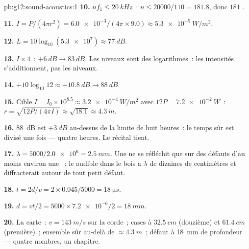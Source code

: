 \begin{solution}{pb:g12:sound-acoustics:1}
\textbf{10.} $nf_1 \le \qty{20}{kHz}$~: $n \le 20000/110 = 181.8$,
donc $181$ .

\textbf{11.} $I = P/(4\pi r^2) = \num{6.0e-3}/(4\pi \times 9.0)
\approx \qty{5.3e-5}{W/m^2}$.

\textbf{12.} $L = 10\log_{10}(\num{5.3e7}) \approx \qty{77}{dB}$.

\textbf{13.} $I \times 4$~: $+\qty{6}{dB} \to \qty{83}{dB}$. Les
niveaux sont des logarithmes~: les intensités s'additionnent, pas les
niveaux.

\textbf{14.} $+10\log_{10}12 \approx +\qty{10.8}{dB} \to
\qty{88}{dB}$.

\textbf{15.} Cible $I = I_0 \times 10^{8.5} \approx
\qty{3.2e-4}{W/m^2}$ avec $12P = \qty{7.2e-2}{W}$~:
$r = \sqrt{12P/(4\pi I)} \approx \sqrt{18.1} \approx \qty{4.3}{m}$.

\textbf{16.} \qty{88}{dB} est $+\qty{3}{dB}$ au-dessus de la limite
de huit heures~: le temps sûr est divisé une fois --- quatre heures. Le
récital tient.

\textbf{17.} $\lambda = 5000/\num{2.0e6} = \qty{2.5}{mm}$. Une
 ne se réfléchit que sur des défauts d'au moins environ une
~: le  audible dans le bois a
$\lambda$ de dizaines de centimètres et diffracterait autour de tout
petit défaut.

\textbf{18.} $t = 2d/v = 2 \times 0.045/5000 = \qty{18}{\micro s}$.

\textbf{19.} $d = vt/2 = 5000 \times \num{7.2e-6}/2 = \qty{18}{mm}$.

\textbf{20.} La carte~: $v = \qty{143}{m/s}$ sur la corde~; cases à
$\qty{32.5}{cm}$ (douzième) et $\qty{61.4}{cm}$ (première)~; ensemble
sûr au-delà de $\approx \qty{4.3}{m}$~; défaut à \qty{18}{mm} de
profondeur --- quatre nombres, un chapitre.
\end{solution}

